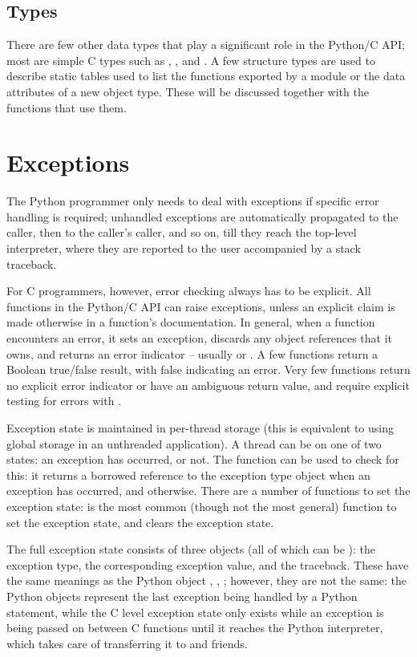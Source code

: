 \documentclass[twoside]{report}
\begin{document}
\subsection{Types}

There are few other data types that play a significant role in 
the Python/C API; most are simple C types such as , 
,  and .  A few structure types 
are used to describe static tables used to list the functions exported 
by a module or the data attributes of a new object type.  These will 
be discussed together with the functions that use them.

\section{Exceptions}

The Python programmer only needs to deal with exceptions if specific 
error handling is required; unhandled exceptions are automatically 
propagated to the caller, then to the caller's caller, and so on, till 
they reach the top-level interpreter, where they are reported to the 
user accompanied by a stack traceback.

For C programmers, however, error checking always has to be explicit.  
All functions in the Python/C API can raise exceptions, unless an 
explicit claim is made otherwise in a function's documentation.  In 
general, when a function encounters an error, it sets an exception, 
discards any object references that it owns, and returns an 
error indicator -- usually \NULL{} or .  A few functions 
return a Boolean true/false result, with false indicating an error.
Very few functions return no explicit error indicator or have an 
ambiguous return value, and require explicit testing for errors with 
.

Exception state is maintained in per-thread storage (this is 
equivalent to using global storage in an unthreaded application).  A 
thread can be on one of two states: an exception has occurred, or not.  
The function  can be used to check for this: it 
returns a borrowed reference to the exception type object when an 
exception has occurred, and \NULL{} otherwise.  There are a number 
of functions to set the exception state:  is 
the most common (though not the most general) function to set the 
exception state, and  clears the exception state.

The full exception state consists of three objects (all of which can 
be \NULL{} ): the exception type, the corresponding exception 
value, and the traceback.  These have the same meanings as the Python 
object , , 
; however, they are not the same: the Python 
objects represent the last exception being handled by a Python 
 statement, while the C level exception state only 
exists while an exception is being passed on between C functions until 
it reaches the Python interpreter, which takes care of transferring it 
to  and friends.
\end{document}
